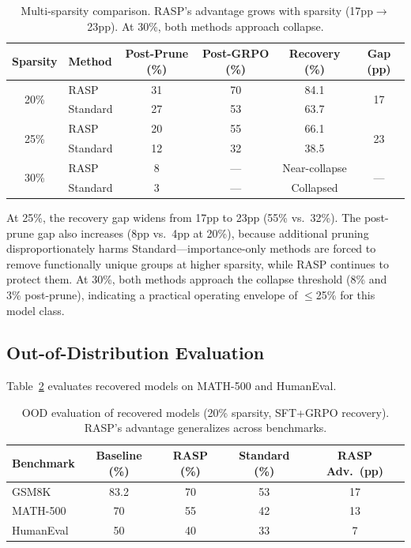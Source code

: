 \documentclass[11pt,a4paper]{article}
\newcommand{\method}{RASP}
\begin{document}
\begin{table}[t]
\centering
\small
\caption{Multi-sparsity comparison. \method{}'s advantage grows with sparsity (17pp$\to$23pp). At 30\%, both methods approach collapse.}
\label{tab:sparsity}
\begin{tabular}{clcccc}
\toprule
\textbf{Sparsity} & \textbf{Method} & \textbf{Post-Prune (\%)} & \textbf{Post-GRPO (\%)} & \textbf{Recovery (\%)} & \textbf{Gap (pp)} \\
\midrule
\multirow{2}{*}{20\%} & \method{} & 31 & 70 & 84.1 & \multirow{2}{*}{17} \\
 & Standard & 27 & 53 & 63.7 & \\
\midrule
\multirow{2}{*}{25\%} & \method{} & 20 & 55 & 66.1 & \multirow{2}{*}{23} \\
 & Standard & 12 & 32 & 38.5 & \\
\midrule
\multirow{2}{*}{30\%} & \method{} & 8 & --- & Near-collapse & \multirow{2}{*}{---} \\
 & Standard & 3 & --- & Collapsed & \\
\bottomrule
\end{tabular}
\end{table}

At 25\%, the recovery gap widens from 17pp to 23pp (55\% vs.\ 32\%). The post-prune gap also increases (8pp vs.\ 4pp at 20\%), because additional pruning disproportionately harms Standard---importance-only methods are forced to remove functionally unique groups at higher sparsity, while \method{} continues to protect them. At 30\%, both methods approach the collapse threshold (8\% and 3\% post-prune), indicating a practical operating envelope of $\leq$25\% for this model class.

\subsection{Out-of-Distribution Evaluation}
\label{sec:ood}

Table~\ref{tab:ood} evaluates recovered models on MATH-500 and HumanEval.

\begin{table}[t]
\centering
\small
\caption{OOD evaluation of recovered models (20\% sparsity, SFT+GRPO recovery). \method{}'s advantage generalizes across benchmarks.}
\label{tab:ood}
\begin{tabular}{lcccc}
\toprule
\textbf{Benchmark} & \textbf{Baseline (\%)} & \textbf{\method{} (\%)} & \textbf{Standard (\%)} & \textbf{\method{} Adv.\ (pp)} \\
\midrule
GSM8K & 83.2 & 70 & 53 & 17 \\
MATH-500 & 70 & 55 & 42 & 13 \\
HumanEval & 50 & 40 & 33 & 7 \\
\bottomrule
\end{tabular}
\end{table}
\end{document}
